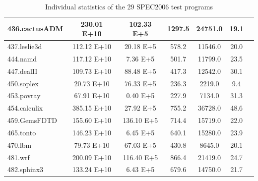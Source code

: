 \begin{table}[h]
\begin{tabular}{|l|c|c|c|c|c|c|}
436.cactusADM    & 230.01 E+10   & 102.33 E+5    & 1297.5        & 24751.0       & 19.1 \\ \hline
437.leslie3d     & 112.12 E+10   & 20.18 E+5     & 578.2         & 11546.0       & 20.0 \\ \hline
444.namd         & 117.12 E+10   & 7.36 E+5      & 501.7         & 11799.0       & 23.5 \\ \hline
447.dealII       & 109.73 E+10   & 88.48 E+5     & 417.3         & 12542.0       & 30.1 \\ \hline
450.soplex       & 20.73 E+10    & 76.33 E+5     & 236.3         & 2219.0        & 9.4 \\ \hline
453.povray       & 67.91 E+10    & 0.40 E+5      & 227.9         & 7134.0        & 31.3 \\ \hline
454.calculix     & 385.15 E+10   & 27.92 E+5     & 755.2         & 36728.0       & 48.6 \\ \hline
459.GemsFDTD     & 155.60 E+10   & 136.10 E+5    & 714.4         & 15719.0       & 22.0 \\ \hline
465.tonto        & 146.23 E+10   & 6.45 E+5      & 640.1         & 15280.0       & 23.9 \\ \hline
470.lbm          & 79.73 E+10    & 67.03 E+5     & 430.8         & 8645.0        & 20.1 \\ \hline
481.wrf          & 200.09 E+10   & 116.40 E+5    & 866.4         & 21419.0       & 24.7 \\ \hline
482.sphinx3      & 133.24 E+10   & 6.43 E+5      & 679.6         & 14750.0       & 21.7 \\ \hline

\end{tabular}
\caption{Individual statistics of the 29 SPEC2006 test programs}
\label{tbl:all-times-spec06}
\end{table}

